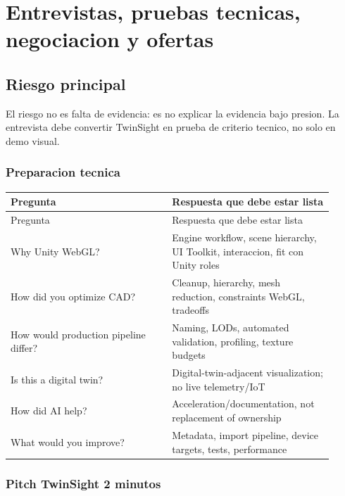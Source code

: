 \chapter{Entrevistas, pruebas tecnicas, negociacion y ofertas}

\section{Riesgo principal}


El riesgo no es falta de evidencia: es no explicar la evidencia bajo presion. La entrevista debe convertir TwinSight en prueba de criterio tecnico, no solo en demo visual.


\subsection{Preparacion tecnica}


\begin{center}
\scriptsize
\begin{longtable}{>{\raggedright\arraybackslash}p{0.455\linewidth} >{\raggedright\arraybackslash}p{0.455\linewidth}}
\toprule
Pregunta & Respuesta que debe estar lista \\
\midrule
\endfirsthead
\toprule
Pregunta & Respuesta que debe estar lista \\
\midrule
\endhead
Why Unity WebGL? & Engine workflow, scene hierarchy, UI Toolkit, interaccion, fit con Unity roles \\
How did you optimize CAD? & Cleanup, hierarchy, mesh reduction, constraints WebGL, tradeoffs \\
How would production pipeline differ? & Naming, LODs, automated validation, profiling, texture budgets \\
Is this a digital twin? & Digital-twin-adjacent visualization; no live telemetry/IoT \\
How did AI help? & Acceleration/documentation, not replacement of ownership \\
What would you improve? & Metadata, import pipeline, device targets, tests, performance \\
\bottomrule
\end{longtable}
\end{center}


\subsection{Pitch TwinSight 2 minutos}


